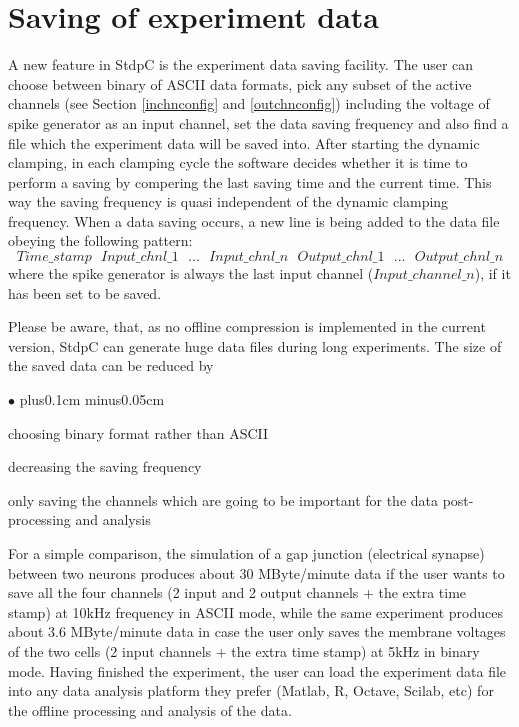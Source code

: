 \documentclass{article}
\newenvironment{myitem}{\begin{list}{$\bullet$}{\setlength{\leftmargin}{1.1em}
\itemsep0.1cm plus0.1cm minus0.05cm
\listparindent0cm
\addtolength{\labelsep}{0.5\labelsep}
\setlength{\labelwidth}{0.8em}
\setlength{\leftmargin}{\labelwidth}
\addtolength{\leftmargin}{\labelsep}
}}{\end{list}}
\begin{document}
\section{Saving of experiment data} \label{datasaving}

A new feature in StdpC is the experiment data saving
facility. The user can choose between binary of ASCII data formats, pick
any subset of the active channels (see Section \ref{inchnconfig} and
\ref{outchnconfig}) including the voltage of spike generator as an input
channel, set the data saving frequency and also find a file which the
experiment data will be saved into. After starting the dynamic clamping,  in
each clamping cycle the software decides whether it is time to perform a
saving by compering the last saving time and the current time. This way the
saving frequency is quasi independent of the dynamic clamping
frequency. When a data saving occurs, a new line is being added to the
data file obeying the following pattern:
\begin{equation*}
Time\_stamp\ \ \ Input\_chnl\_1
\ \ \ ...\ \ \ Input\_chnl\_n\ \ \  Output\_chnl\_1\ \ \ ...\ \ \ Output\_chnl\_n  
\end{equation*}
where the spike generator is always the last input channel
($Input\_channel\_n$), if it has been set to be saved.

Please be aware, that, as no offline compression is implemented in the
current version, StdpC can generate huge data files during long
experiments. The size of the saved data can be reduced by
\begin{myitem} 
\item choosing binary format rather than ASCII
\item decreasing the saving frequency
\item only saving the channels which are going to be important for the data
  post-processing and analysis
\end{myitem}
For a simple comparison, the simulation of a gap junction (electrical
synapse) between two neurons produces about 30 MByte/minute data if the
user wants to save all the four channels (2 input and 2 output channels
+ the extra time stamp) at 10kHz frequency in ASCII mode, while the same
experiment produces about 3.6 MByte/minute data in case the user only saves the
membrane voltages of the two cells (2 input channels + the extra time
stamp) at 5kHz in binary mode. 
Having finished the experiment, the user can load the experiment data file
into any data analysis platform they prefer (Matlab, R, Octave, Scilab,
etc) for the offline processing and analysis of the data.
\end{document}
